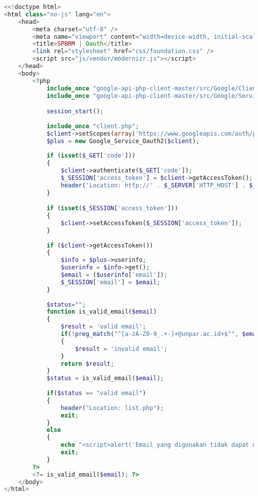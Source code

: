 \begin{lstlisting}[language=php,basicstyle=\tiny,caption=oauth.php]
<<!doctype html>
<html class="no-js" lang="en">
	<head>
		<meta charset="utf-8" />
		<meta name="viewport" content="width=device-width, initial-scale=1.0" />
		<title>SPBRM | Oauth</title>
		<link rel="stylesheet" href="css/foundation.css" />
		<script src="js/vendor/modernizr.js"></script>
	</head>
	<body>
		<?php
			include_once "google-api-php-client-master/src/Google/Client.php";
			include_once "google-api-php-client-master/src/Google/Service/Oauth2.php";

			session_start();
			
			include_once "client.php";
			$client->setScopes(array('https://www.googleapis.com/auth/plus.login','email'));
			$plus = new Google_Service_Oauth2($client);
			
			if (isset($_GET['code']))
			{
				$client->authenticate($_GET['code']);
				$_SESSION['access_token'] = $client->getAccessToken();
				header('Location: http://' . $_SERVER['HTTP_HOST'] . $_SERVER['PHP_SELF']);
			}

			if (isset($_SESSION['access_token']))
			{
				$client->setAccessToken($_SESSION['access_token']);
			}
			
			if ($client->getAccessToken()) 
			{
				$info = $plus->userinfo;
				$userinfo = $info->get();
				$email = ($userinfo['email']);
				$_SESSION['email'] = $email;
			}
			
			$status="";
			function is_valid_email($email)
			{
				$result = 'valid email';
				if(!preg_match("^[a-zA-Z0-9_.+-]+@unpar.ac.id+$^", $email) && !preg_match("^[a-zA-Z0-9_.+-]+@student.unpar.ac.id+$^", $email))
				{
					$result = 'invalid email';
				}
				return $result;
			}
			$status = is_valid_email($email);
			
			if($status == "valid email")
			{
				header("Location: list.php");
				exit;
			}
			else
			{
				echo "<script>alert('Email yang digunakan tidak dapat mengakses SPBRM. Email yang dapat digunakan untuk mengakses SPBRM adalah email yang diakhiri @unpar.ac.id atau @student.unpar.ac.id.');window.location.href='index.php?logout';</script>";
				exit;
			}
		?>
		<?= is_valid_email($email); ?>
	</body>
</html>
\end{lstlisting}

